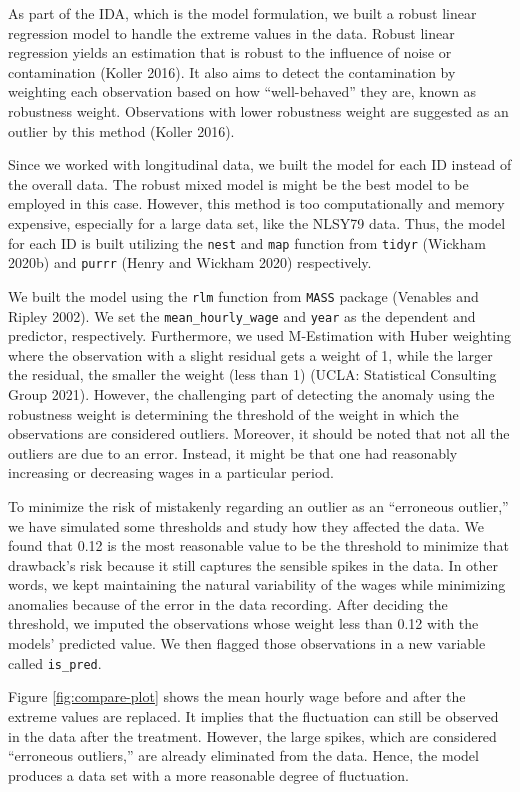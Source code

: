 \documentclass{article}
\begin{document}
As part of the IDA, which is the model formulation, we built a robust linear regression model to handle the extreme values in the data. Robust linear regression yields an estimation that is robust to the influence of noise or contamination (Koller 2016). It also aims to detect the contamination by weighting each observation based on how ``well-behaved'' they are, known as robustness weight. Observations with lower robustness weight are suggested as an outlier by this method (Koller 2016).

Since we worked with longitudinal data, we built the model for each ID instead of the overall data. The robust mixed model is might be the best model to be employed in this case. However, this method is too computationally and memory expensive, especially for a large data set, like the NLSY79 data. Thus, the model for each ID is built utilizing the \texttt{nest} and \texttt{map} function from \texttt{tidyr} (Wickham 2020b) and \texttt{purrr} (Henry and Wickham 2020) respectively.

We built the model using the \texttt{rlm} function from \texttt{MASS} package (Venables and Ripley 2002). We set the \texttt{mean\_hourly\_wage} and \texttt{year} as the dependent and predictor, respectively. Furthermore, we used M-Estimation with Huber weighting where the observation with a slight residual gets a weight of 1, while the larger the residual, the smaller the weight (less than 1) (UCLA: Statistical Consulting Group 2021). However, the challenging part of detecting the anomaly using the robustness weight is determining the threshold of the weight in which the observations are considered outliers. Moreover, it should be noted that not all the outliers are due to an error. Instead, it might be that one had reasonably increasing or decreasing wages in a particular period.

To minimize the risk of mistakenly regarding an outlier as an ``erroneous outlier,'' we have simulated some thresholds and study how they affected the data. We found that 0.12 is the most reasonable value to be the threshold to minimize that drawback's risk because it still captures the sensible spikes in the data. In other words, we kept maintaining the natural variability of the wages while minimizing anomalies because of the error in the data recording. After deciding the threshold, we imputed the observations whose weight less than 0.12 with the models' predicted value. We then flagged those observations in a new variable called \texttt{is\_pred}.

Figure \ref{fig:compare-plot} shows the mean hourly wage before and after the extreme values are replaced. It implies that the fluctuation can still be observed in the data after the treatment. However, the large spikes, which are considered ``erroneous outliers,'' are already eliminated from the data. Hence, the model produces a data set with a more reasonable degree of fluctuation.
\end{document}
